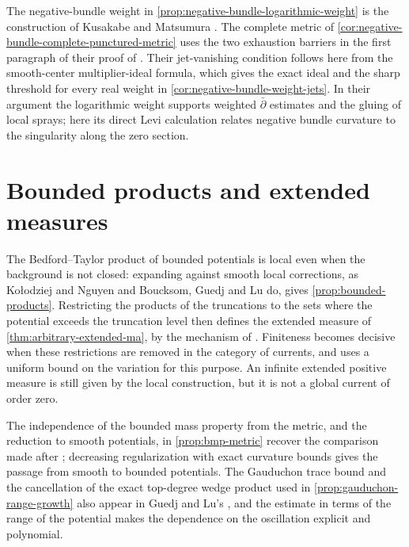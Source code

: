 The negative-bundle weight in \cref{prop:negative-bundle-logarithmic-weight} is the construction of Kusakabe and Matsumura \cite[v1, Lemma~3.2(a,b,d), pp.~20--21]{KusakabeMatsumuraOka26}. The complete metric of \cref{cor:negative-bundle-complete-punctured-metric} uses the two exhaustion barriers in the first paragraph of their proof of \cite[v1, Lemma~3.3, p.~21]{KusakabeMatsumuraOka26}. Their jet-vanishing condition \cite[v1, Lemma~3.4, p.~21]{KusakabeMatsumuraOka26} follows here from the smooth-center multiplier-ideal formula, which gives the exact ideal and the sharp threshold for every real weight in \cref{cor:negative-bundle-weight-jets}. In their argument the logarithmic weight supports weighted $\bar\partial$ estimates and the gluing of local sprays; here its direct Levi calculation relates negative bundle curvature to the singularity along the zero section.

\section{Bounded products and extended measures}
\label{sec:history-products}

The Bedford--Taylor product of bounded potentials is local even when the background is not closed: expanding against smooth local corrections, as Ko{\l}odziej and Nguyen \cite[Section~1]{KN15} and Boucksom, Guedj and Lu \cite[Section~2.1]{BGL25} do, gives \cref{prop:bounded-products}. Restricting the products of the truncations to the sets where the potential exceeds the truncation level then defines the extended measure of \cref{thm:arbitrary-extended-ma}, by the mechanism of \cite[Proposition~2.1]{BGL25}. Finiteness becomes decisive when these restrictions are removed in the category of currents, and \cite[Theorem~2.2]{BGL25} uses a uniform bound on the variation for this purpose. An infinite extended positive measure is still given by the local construction, but it is not a global current of order zero.

The independence of the bounded mass property from the metric, and the reduction to smooth potentials, in \cref{prop:bmp-metric} recover the comparison made after \cite[Definition~1.16]{BGL25}; decreasing regularization with exact curvature bounds gives the passage from smooth to bounded potentials. The Gauduchon trace bound and the cancellation of the exact top-degree wedge product used in \cref{prop:gauduchon-range-growth} also appear in Guedj and Lu's \cite[Proposition 3.3(i), (vi)]{GL22}, and the estimate in terms of the range of the potential makes the dependence on the oscillation explicit and polynomial.

